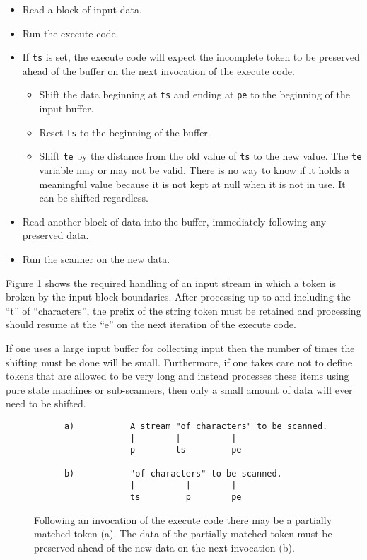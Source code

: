 \documentclass[letterpaper,11pt,oneside]{book}
\begin{document}
\begin{itemize}
\setlength{\parskip}{0pt}
\item Read a block of input data.
\item Run the execute code.
\item If \verb|ts| is set, the execute code will expect the incomplete
token to be preserved ahead of the buffer on the next invocation of the execute
code.  
\begin{itemize}
\item Shift the data beginning at \verb|ts| and ending at \verb|pe| to the
beginning of the input buffer.
\item Reset \verb|ts| to the beginning of the buffer. 
\item Shift \verb|te| by the distance from the old value of \verb|ts|
to the new value. The \verb|te| variable may or may not be valid.  There is
no way to know if it holds a meaningful value because it is not kept at null
when it is not in use. It can be shifted regardless.
\end{itemize}
\item Read another block of data into the buffer, immediately following any
preserved data.
\item Run the scanner on the new data.
\end{itemize}

Figure \ref{preserve_example} shows the required handling of an input stream in
which a token is broken by the input block boundaries. After processing up to
and including the ``t'' of ``characters'', the prefix of the string token must be
retained and processing should resume at the ``e'' on the next iteration of
the execute code.

If one uses a large input buffer for collecting input then the number of times
the shifting must be done will be small. Furthermore, if one takes care not to
define tokens that are allowed to be very long and instead processes these
items using pure state machines or sub-scanners, then only a small amount of
data will ever need to be shifted.

\begin{figure}
\begin{verbatim}
      a)           A stream "of characters" to be scanned.
                   |        |          |
                   p        ts         pe

      b)           "of characters" to be scanned.
                   |          |        |
                   ts         p        pe
\end{verbatim}
\caption{Following an invocation of the execute code there may be a partially
matched token (a). The data of the partially matched token 
must be preserved ahead of the new data on the next invocation (b).}
\label{preserve_example}
\end{figure}
\end{document}
